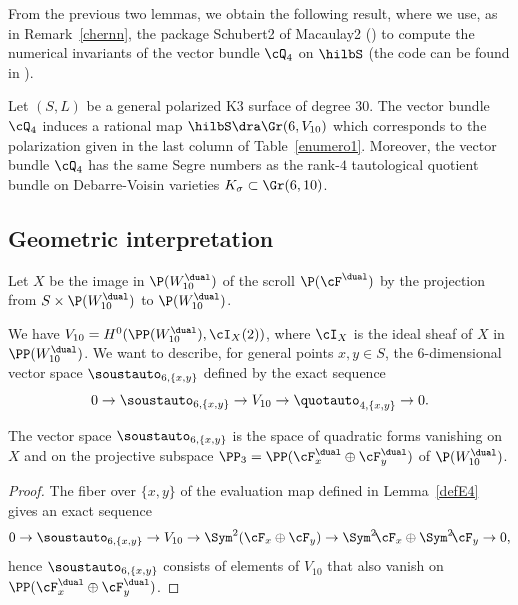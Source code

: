 From the previous two lemmas, we obtain the following result, where we use, as in Remark~\ref{chernn}, the package
Schubert2 of Macaulay2 (\cite{macaulay2}) to compute the numerical invariants of
the vector bundle $\cQ_4$ on $\hilbS$ (the code can be found in \cite{comp}).

\begin{prop}
Let $(S,L)$ be a general polarized K3 surface of degree $30$.
The vector bundle~$\cQ_4$ induces a rational map $\hilbS\dra\Gr(6,V_{10})$ which corresponds to
the polarization given in the last column of Table~\ref{enumero1}.
Moreover,
the vector bundle $\cQ_4$ has the same Segre numbers as the rank-$4$
tautological quotient bundle on Debarre-Voisin varieties $K_\sigma\subset
\Gr(6,10)$.
\end{prop}

\subsection{Geometric interpretation}
Let $X$ be the image in $\P(W_{10}^{\dual})$ of the scroll $\P(\cF^{\dual})$ by the projection from $S\times \P(W_{10}^{\dual})$ to $\P(W_{10}^{\dual})$.

We have $V_{10} = H^0(\PP(W_{10}^\dual),\cI_X(2))$, where $\cI_X$ is the ideal sheaf of $X$ in
$\PP(W_{10}^\dual)$. We want to describe, for general points $x,y\in
S$, the $6$-dimensional vector space $\soustauto_{6,\{x,y\}}$ defined by the exact sequence
\[
0 \to\soustauto_{6,\{x,y\}}\to V_{10} \to \quotauto_{4,\{x,y\}}\to 0.
\]

\begin{prop}
The vector space $\soustauto_{6,\{x,y\}} $ is the space of quadratic forms vanishing on $X$ and on the projective subspace $\PP_3=\PP(\cF_x^\dual \oplus \cF_y^\dual)$ of $\P(W_{10}^{\dual})$.
\end{prop}

\begin{proof}
The fiber over $\{x,y\}$ of the evaluation map defined in
Lemma~\ref{defE4} gives an exact sequence
\[
0 \to \soustauto_{6,\{x,y\}} \to V_{10} \to \Sym^2(\cF_x \oplus \cF_y) \to \Sym^2\! \cF_x \oplus \Sym^2\!\cF_y \to 0,
\]
hence $\soustauto_{6,\{x,y\}}$ consists of elements of $V_{10} $ that also vanish on $\PP(\cF_x^\dual \oplus \cF_y^\dual)$.
\end{proof}

